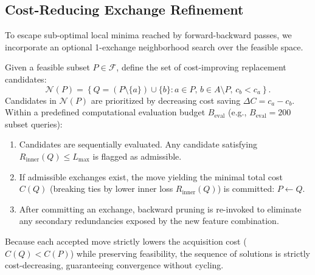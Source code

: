 \subsection{Cost-Reducing Exchange Refinement}
\label{sub-sec:optional}
To escape sub-optimal local minima reached by forward-backward passes, we incorporate an optional 1-exchange neighborhood search over the feasible space.

Given a feasible subset $P \in \mathcal{F}$, define the set of cost-improving replacement candidates:
\begin{equation}
	\mathcal{N}(P) = \left\{ Q = (P \setminus \{a\}) \cup \{b\} : a \in P, \, b \in A \setminus P, \, c_b < c_a \right\}.
\end{equation}
Candidates in $\mathcal{N}(P)$ are prioritized by decreasing cost saving $\Delta C = c_a - c_b$. Within a predefined computational evaluation budget $B_{\mathrm{eval}}$ (e.g., $B_{\mathrm{eval}} = 200$ subset queries):
\begin{enumerate}
	\item Candidates are sequentially evaluated. Any candidate satisfying $R_{\mathrm{inner}}(Q) \le L_{\max}$ is flagged as admissible.
	\item If admissible exchanges exist, the move yielding the minimal total cost $C(Q)$ (breaking ties by lower inner loss $R_{\mathrm{inner}}(Q)$) is committed: $P \gets Q$.
	\item After committing an exchange, backward pruning is re-invoked to eliminate any secondary redundancies exposed by the new feature combination.
\end{enumerate}
Because each accepted move strictly lowers the acquisition cost ($C(Q) < C(P)$) while preserving feasibility, the sequence of solutions is strictly cost-decreasing, guaranteeing convergence without cycling.

